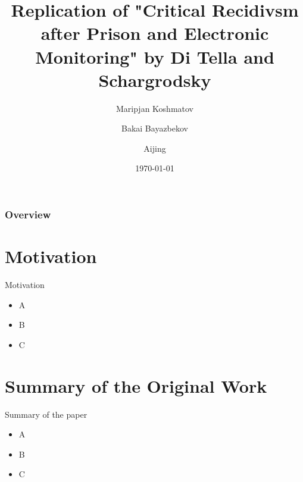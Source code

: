 \documentclass{beamer}
\title[Short title]{Replication of "Critical Recidivsm after Prison and Electronic Monitoring" by Di Tella and Schargrodsky} %
\author{Maripjan Koshmatov \and Bakai Bayazbekov \and Aijing } %
\institute[LMU Munich] %
{
University of Munich \\ %
\medskip
}
\date{\today} %
\begin{document}
\begin{frame}
\titlepage %
\end{frame}

\begin{frame}
\frametitle{Overview} %
\tableofcontents %
\end{frame}



\section{Motivation}
\begin{frame}{Motivation}
    \begin{itemize}
        \item A
        \item B
        \item C
    \end{itemize}
\end{frame}
\section{Summary of the Original Work}
\begin{frame}{Summary of the paper}
\begin{itemize}
        \item A
        \item B
        \item C
    \end{itemize}
\end{frame}
\end{document}
